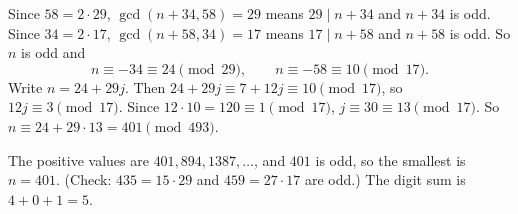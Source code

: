 Since $58=2\cdot29$, $\gcd(n+34,58)=29$ means $29\mid n+34$ and $n+34$ is odd. Since $34=2\cdot17$, $\gcd(n+58,34)=17$ means $17\mid n+58$ and $n+58$ is odd. So $n$ is odd and
\[n\equiv-34\equiv24\pmod{29},\qquad n\equiv-58\equiv10\pmod{17}.\]
Write $n=24+29j$. Then $24+29j\equiv7+12j\equiv10\pmod{17}$, so $12j\equiv3\pmod{17}$. Since $12\cdot10=120\equiv1\pmod{17}$, $j\equiv30\equiv13\pmod{17}$. So $n\equiv24+29\cdot13=401\pmod{493}$.

The positive values are $401,894,1387,\dots$, and $401$ is odd, so the smallest is $n=401$. (Check: $435=15\cdot29$ and $459=27\cdot17$ are odd.) The digit sum is $4+0+1=\boxed{5}$.
